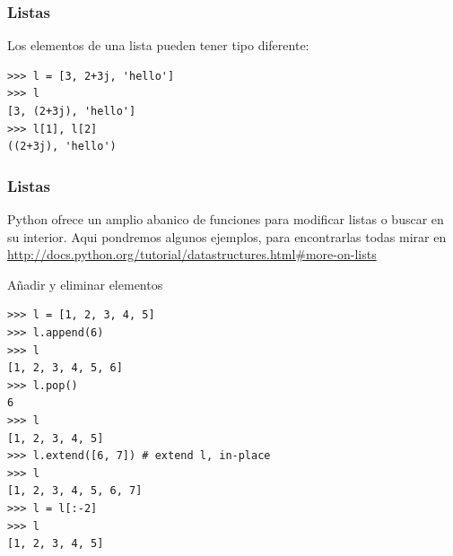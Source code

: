 \documentclass[10pt,colorlinks]{beamer}
\begin{document}
\begin{frame}[fragile]\frametitle{Listas}
\begin{block}{Los elementos de una lista pueden tener tipo diferente:}
\begin{verbatim}
>>> l = [3, 2+3j, 'hello']
>>> l
[3, (2+3j), 'hello']
>>> l[1], l[2]
((2+3j), 'hello')
\end{verbatim}

\end{block}

\end{frame}
\begin{frame}[fragile]\frametitle{Listas}
\vspace{-0.2cm}
\small
Python ofrece un amplio abanico de funciones para modificar listas o buscar en su interior. Aqui pondremos algunos ejemplos, para encontrarlas todas mirar en \href{http://docs.python.org/tutorial/datastructures.html#more-on-lists}{http://docs.python.org/tutorial/datastructures.html\#more-on-lists}
\vspace{-0.2cm}
\begin{block}{Añadir y eliminar elementos}
\tiny
\begin{verbatim}
>>> l = [1, 2, 3, 4, 5]
>>> l.append(6)
>>> l
[1, 2, 3, 4, 5, 6]
>>> l.pop()
6
>>> l
[1, 2, 3, 4, 5]
>>> l.extend([6, 7]) # extend l, in-place
>>> l
[1, 2, 3, 4, 5, 6, 7]
>>> l = l[:-2]
>>> l
[1, 2, 3, 4, 5]
\end{verbatim}

\end{block}
\end{frame}
\end{document}
